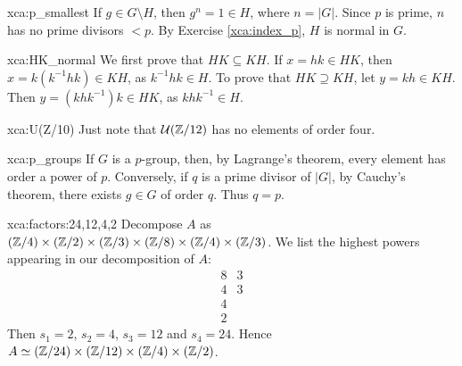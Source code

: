\begin{sol}{xca:p_smallest}
    If $g\in G\setminus H$, then $g^n=1\in H$, where $n=|G|$. Since $p$ is prime, $n$ has no prime divisors $<p$. By Exercise \ref{xca:index_p}, $H$ is normal in $G$.
\end{sol}

\begin{sol}{xca:HK_normal}
We first prove that
$HK\subseteq KH$. If $x=hk\in HK$, then
 $x=k(k^{-1}hk)\in KH$, as $k^{-1}hk\in H$. To prove 
that $HK\supseteq KH$, let $y=kh\in KH$. Then $y=(khk^{-1})k\in HK$, as  $khk^{-1}\in H$. 
\end{sol}

\begin{sol}{xca:U(Z/10)}
Just note that $\mathcal{U}(\mathbb{Z}/12)$ has no elements of order four.
\end{sol}

\begin{sol}{xca:p_groups}
    If $G$ is a $p$-group, then, by Lagrange's theorem, 
    every element has order a power of $p$. Conversely, 
    if $q$ is a prime divisor of $|G|$, by 
    Cauchy's theorem, there exists $g\in G$ of order $q$. Thus $q=p$.
\end{sol}


\begin{sol}{xca:factors:24,12,4,2}
Decompose $A$ as $(\mathbb{Z}/4)\times(\mathbb{Z}/2)\times(\mathbb{Z}/3)\times(\mathbb{Z}/8)\times(\mathbb{Z}/4)\times(\mathbb{Z}/3)$.
We list the highest powers appearing in our decomposition of $A$: 
\[ 
\begin{matrix}
8&3\\
4&3\\
4\\
2
\end{matrix} 
\] 
Then $s_1=2$, $s_2=4$, $s_3=12$ and $s_4=24$. Hence 
$A\simeq (\mathbb{Z}/24)\times(\mathbb{Z}/12)\times(\mathbb{Z}/4)\times(\mathbb{Z}/2)$.
\end{sol}

